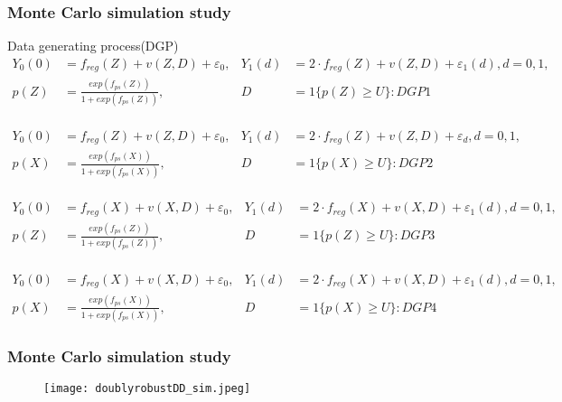 \documentclass{beamer}
\begin{document}
\begin{spacing}{0.5}
\begin{frame}\frametitle{Monte Carlo simulation study}
    \footnotesize
    \begin{block}{Data generating process(DGP)}
        \begin{align*}
            Y_{0}(0) &= f_{reg}(Z) + v(Z, D) + \varepsilon_{0}, & Y_{1}(d) &= 2 \cdot f_{reg}(Z) + v(Z, D) + \varepsilon_{1}(d),d = 0,1, \\[-2pt]
            p(Z) &= \frac{exp(f_{ps}(Z))}{1 + exp(f_{ps}(Z))}, & D &= 1\{p(Z)\geq U\}:DGP1
        \end{align*}
        \\
        \begin{align*}
            Y_{0}(0) &= f_{reg}(Z) + v(Z, D) + \varepsilon_{0}, & Y_{1}(d) &= 2 \cdot f_{reg}(Z) + v(Z, D) + \varepsilon_{d}, d = 0,1, \\[-2pt]
            p(X) &= \frac{exp(f_{ps}(X))}{1 + exp(f_{ps}(X))}, & D &= 1\{p(X) \geq U\}:DGP2
        \end{align*}
        \\
        \begin{align*}
            Y_{0}(0) &= f_{reg}(X) + v(X, D) + \varepsilon_{0}, & Y_{1}(d) &= 2 \cdot f_{reg}(X) + v(X, D) + \varepsilon_{1}(d), d = 0,1,\\[-2pt]
            p(Z) &= \frac{exp(f_{ps}(Z))}{1 + exp(f_{ps}(Z))}, & D &= 1\{p(Z) \geq U\}:DGP3
        \end{align*}
        \\
        \begin{align*}
            Y_{0}(0) &= f_{reg}(X) + v(X, D) + \varepsilon_{0}, & Y_{1}(d) &= 2 \cdot f_{reg}(X) + v(X, D) + \varepsilon_{1}(d), d = 0,1,\\[-2pt]
            p(X) &= \frac{exp(f_{ps}(X))}{1 + exp(f_{ps}(X))}, & D &= 1\{p(X) \geq U\}:DGP4
        \end{align*}
    \end{block}
    \normalsize
\end{frame}
\end{spacing}

\begin{frame}\frametitle{Monte Carlo simulation study}
    \begin{figure}
        \centering
        \texttt{[image: doublyrobustDD\_sim.jpeg]}
    \end{figure}
\end{frame}
\end{document}
